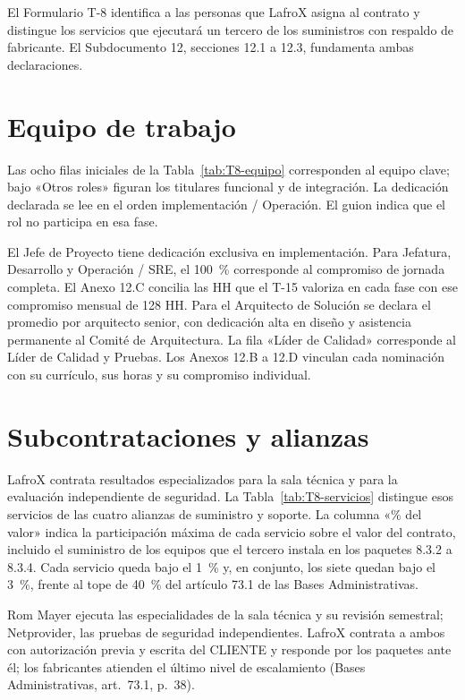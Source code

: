 \setlength{\tabcolsep}{4pt}
El Formulario T-8 identifica a las personas que LafroX asigna al contrato y distingue los servicios que ejecutará un tercero de los suministros con respaldo de fabricante. El Subdocumento 12, secciones 12.1 a 12.3, fundamenta ambas declaraciones.

\section{Equipo de trabajo}

Las ocho filas iniciales de la Tabla~\ref{tab:T8-equipo} corresponden al equipo clave; bajo «Otros roles» figuran los titulares funcional y de integración. La dedicación declarada se lee en el orden implementación / Operación. El guion indica que el rol no participa en esa fase.


El Jefe de Proyecto tiene dedicación exclusiva en implementación. Para Jefatura, Desarrollo y Operación / SRE, el 100~\% corresponde al compromiso de jornada completa. El Anexo 12.C concilia las HH que el T-15 valoriza en cada fase con ese compromiso mensual de 128 HH. Para el Arquitecto de Solución se declara el promedio por arquitecto senior, con dedicación alta en diseño y asistencia permanente al Comité de Arquitectura. La fila «Líder de Calidad» corresponde al Líder de Calidad y Pruebas. Los Anexos 12.B a 12.D vinculan cada nominación con su currículo, sus horas y su compromiso individual.

\section{Subcontrataciones y alianzas}

LafroX contrata resultados especializados para la sala técnica y para la evaluación independiente de seguridad. La Tabla~\ref{tab:T8-servicios} distingue esos servicios de las cuatro alianzas de suministro y soporte. La columna «\% del valor» indica la participación máxima de cada servicio sobre el valor del contrato, incluido el suministro de los equipos que el tercero instala en los paquetes 8.3.2 a 8.3.4. Cada servicio queda bajo el 1~\% y, en conjunto, los siete quedan bajo el 3~\%, frente al tope de 40~\% del artículo 73.1 de las Bases Administrativas.


Rom Mayer ejecuta las especialidades de la sala técnica y su revisión semestral; Netprovider, las pruebas de seguridad independientes. LafroX contrata a ambos con autorización previa y escrita del CLIENTE y responde por los paquetes ante él; los fabricantes atienden el último nivel de escalamiento (Bases Administrativas, art.~73.1, p.~38).
